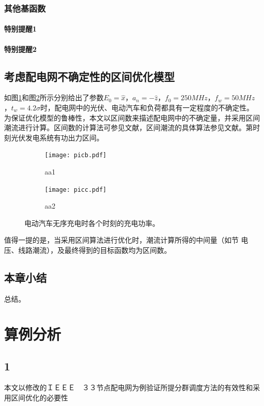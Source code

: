 \documentclass[bachelor]{NCEPU-thesis}
\begin{document}
\subsection{其他基函数}

\subsubsection{特别提醒1}

\subsubsection{特别提醒2}

\section{考虑配电网不确定性的区间优化模型}

如图\ref{picb}和图\ref{picc}所示分别给出了参数$E_0=\hat{x}$，$a_n=-\hat{z}$，$f_0=250MHz$，$f_w=50MHz$，$t_w=4.2\sigma$时，配电网中的光伏、电动汽车和负荷都具有一定程度的不确定性。为保证优化模型的鲁棒性，本文以区间数来描述配电网中的不确定量，并采用区间潮流进行计算。区间数的计算法可参见文献，区间潮流的具体算法参见文献。第时刻光伏发电系统有功出力区间。

\begin{figure}[h]
	\begin{subfigure}[b]{0.5\linewidth}
		\label{picb}
		\texttt{[image: picb.pdf]}
        \caption{aa1}
    \end{subfigure}
	\begin{subfigure}[b]{0.5\linewidth}
		\label{picc}
		\texttt{[image: picc.pdf]}
        \caption{aa2}
    \end{subfigure}
	\caption{电动汽车无序充电时各个时刻的充电功率。}
	\label{fig1}
\end{figure}
值得一提的是，当采用区间算法进行优化时，潮流计算所得的中间量（如节 电压、线路潮流），及最终得到的目标函数均为区间数。

\section{本章小结}
总结。

\chapter{算例分析}
\section{1}
本文以修改的ＩＥＥＥ　３３节点配电网为例验证所提分群调度方法的有效性和采用区间优化的必要性
\end{document}
